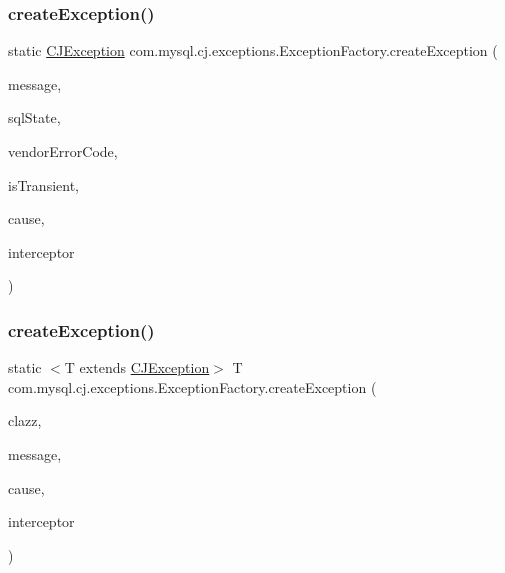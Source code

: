 \subsubsection{\texorpdfstring{create\+Exception()}{createException()}\hspace{0.1cm}{\footnotesize\ttfamily [8/9]}}
{\footnotesize\ttfamily static \mbox{\hyperlink{classcom_1_1mysql_1_1cj_1_1exceptions_1_1_c_j_exception}{C\+J\+Exception}} com.\+mysql.\+cj.\+exceptions.\+Exception\+Factory.\+create\+Exception (\begin{DoxyParamCaption}\item[{String}]{message,  }\item[{String}]{sql\+State,  }\item[{int}]{vendor\+Error\+Code,  }\item[{boolean}]{is\+Transient,  }\item[{Throwable}]{cause,  }\item[{\mbox{\hyperlink{interfacecom_1_1mysql_1_1cj_1_1exceptions_1_1_exception_interceptor}{Exception\+Interceptor}}}]{interceptor }\end{DoxyParamCaption})\hspace{0.3cm}{\ttfamily [static]}}

\mbox{\label{classcom_1_1mysql_1_1cj_1_1exceptions_1_1_exception_factory_a3f60b3a0bdec23f573ae589ada6c5c1e}} 
\subsubsection{\texorpdfstring{create\+Exception()}{createException()}\hspace{0.1cm}{\footnotesize\ttfamily [9/9]}}
{\footnotesize\ttfamily static $<$T extends \mbox{\hyperlink{classcom_1_1mysql_1_1cj_1_1exceptions_1_1_c_j_exception}{C\+J\+Exception}}$>$ T com.\+mysql.\+cj.\+exceptions.\+Exception\+Factory.\+create\+Exception (\begin{DoxyParamCaption}\item[{Class$<$ T $>$}]{clazz,  }\item[{String}]{message,  }\item[{Throwable}]{cause,  }\item[{\mbox{\hyperlink{interfacecom_1_1mysql_1_1cj_1_1exceptions_1_1_exception_interceptor}{Exception\+Interceptor}}}]{interceptor }\end{DoxyParamCaption})\hspace{0.3cm}{\ttfamily [static]}}


